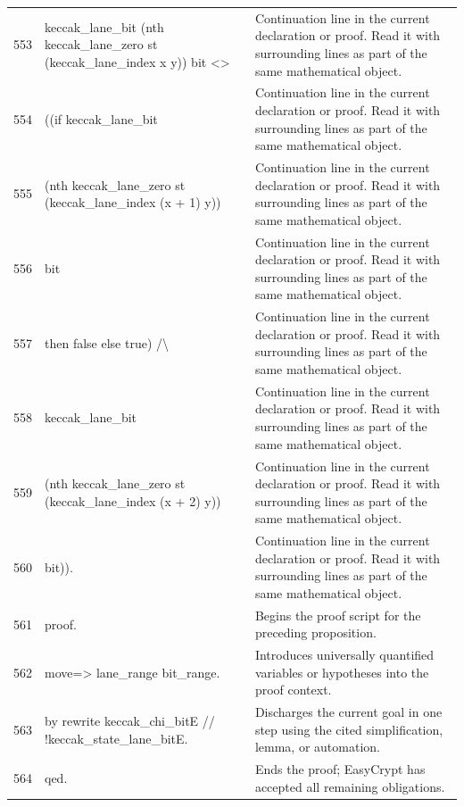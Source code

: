 \documentclass[10pt]{article}
\begin{document}
\begin{longtable}{r L{0.53\textwidth} L{0.37\textwidth}}
553 & {\ttfamily\scriptsize    keccak\_lane\_bit (nth keccak\_lane\_zero st (keccak\_lane\_index x y)) bit <>} & Continuation line in the current declaration or proof.  Read it with surrounding lines as part of the same mathematical object. \\
554 & {\ttfamily\scriptsize    ((if keccak\_lane\_bit} & Continuation line in the current declaration or proof.  Read it with surrounding lines as part of the same mathematical object. \\
555 & {\ttfamily\scriptsize           (nth keccak\_lane\_zero st (keccak\_lane\_index (x + 1) y))} & Continuation line in the current declaration or proof.  Read it with surrounding lines as part of the same mathematical object. \\
556 & {\ttfamily\scriptsize           bit} & Continuation line in the current declaration or proof.  Read it with surrounding lines as part of the same mathematical object. \\
557 & {\ttfamily\scriptsize      then false else true) /\textbackslash{}} & Continuation line in the current declaration or proof.  Read it with surrounding lines as part of the same mathematical object. \\
558 & {\ttfamily\scriptsize     keccak\_lane\_bit} & Continuation line in the current declaration or proof.  Read it with surrounding lines as part of the same mathematical object. \\
559 & {\ttfamily\scriptsize       (nth keccak\_lane\_zero st (keccak\_lane\_index (x + 2) y))} & Continuation line in the current declaration or proof.  Read it with surrounding lines as part of the same mathematical object. \\
560 & {\ttfamily\scriptsize       bit)).} & Continuation line in the current declaration or proof.  Read it with surrounding lines as part of the same mathematical object. \\
561 & {\ttfamily\scriptsize proof.} & Begins the proof script for the preceding proposition. \\
562 & {\ttfamily\scriptsize move=> lane\_range bit\_range.} & Introduces universally quantified variables or hypotheses into the proof context. \\
563 & {\ttfamily\scriptsize by rewrite keccak\_chi\_bitE // !keccak\_state\_lane\_bitE.} & Discharges the current goal in one step using the cited simplification, lemma, or automation. \\
564 & {\ttfamily\scriptsize qed.} & Ends the proof; EasyCrypt has accepted all remaining obligations. \\

\end{longtable}
\end{document}
